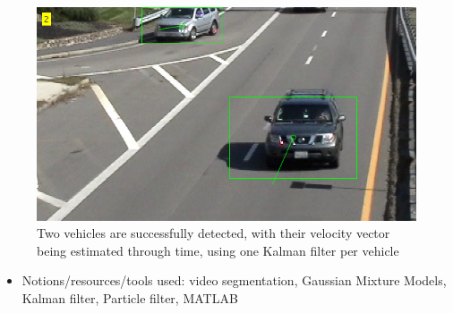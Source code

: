 \begin{figure}[H]\centering
  \includegraphics[scale=0.55]{images/kf_1.png}
  \caption{\small Two vehicles are successfully detected, with their velocity
           vector being estimated through time, using one Kalman filter per
           vehicle}
  \label{fig:kf_1}
\end{figure}

\begin{itemize}
\item Notions/resources/tools used: video segmentation, Gaussian Mixture Models, Kalman filter,
Particle filter, MATLAB
\end{itemize}
